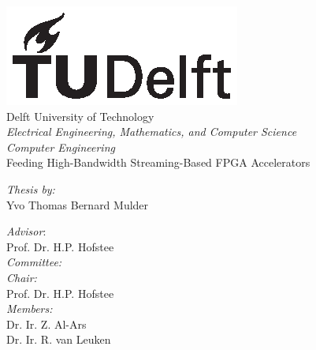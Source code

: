\thispagestyle{empty}
\begin{titlingpage}
    \centering
    \includegraphics{./frontmatter/images/TU_Delft_logo_Black.eps}\\
    {\LARGE Delft University of Technology}\\[1.2em]

    \textit{Electrical Engineering, Mathematics, and Computer Science} \\
    \textit{Computer Engineering} \\
    \vfill
    {\LARGE Feeding High-Bandwidth Streaming-Based FPGA Accelerators} \\
    \vfill
    \begin{flushright}
        {\large \textit{Thesis{} by:} \\[0.5em]
        Yvo Thomas Bernard Mulder\\[0.5em]
        }
    \end{flushright}
    \begin{flushleft}
        {\large \textit{Advisor}: \\[0.5em]
        Prof. Dr. H.P. Hofstee
        \\[1.5em]
        \textit{Committee:}\\[1em]
        \textit{Chair:} \\[0.2em]
        Prof. Dr. H.P. Hofstee \\[1em]
        \textit{Members:} \\[0.2em]
        Dr. Ir. Z. Al-Ars\\
        Dr. Ir. R. van Leuken\\}
    \end{flushleft}

\end{titlingpage}
